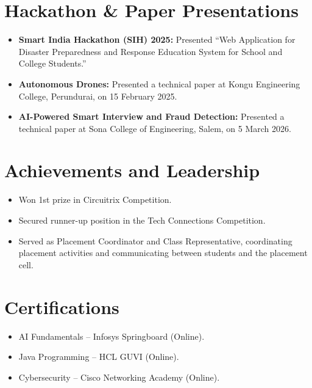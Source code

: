 \documentclass[10pt,a4paper]{article}
\begin{document}

\section*{Hackathon \& Paper Presentations}

\begin{itemize}
    \item \textbf{Smart India Hackathon (SIH) 2025:}
    Presented ``Web Application for Disaster Preparedness and Response Education System for School and College Students.''

    \item \textbf{Autonomous Drones:}
    Presented a technical paper at Kongu Engineering College, Perundurai, on 15 February 2025.

    \item \textbf{AI-Powered Smart Interview and Fraud Detection:}
    Presented a technical paper at Sona College of Engineering, Salem, on 5 March 2026.
\end{itemize}


\section*{Achievements and Leadership}

\begin{itemize}
    \item Won 1st prize in Circuitrix Competition.
    \item Secured runner-up position in the Tech
    Connections Competition.
    \item Served as Placement Coordinator and Class
    Representative, coordinating placement activities
    and communicating between students and the
    placement cell.
\end{itemize}


\section*{Certifications}

\begin{itemize}
    \item AI Fundamentals -- Infosys Springboard (Online).
    \item Java Programming -- HCL GUVI (Online).
    \item Cybersecurity -- Cisco Networking Academy (Online).
\end{itemize}
\end{document}
